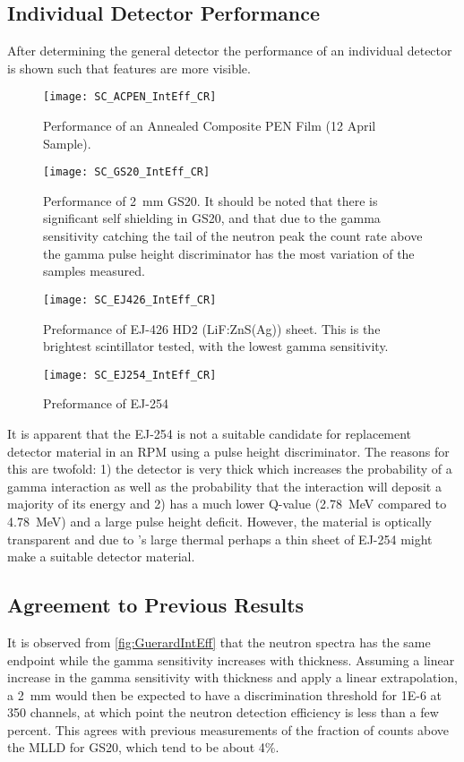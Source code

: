 \documentclass[draftcls,onecolumn]{IEEEtran}
\begin{document}
\subsection{Individual Detector Performance}
After determining the general detector the performance of an individual detector is shown such that features are more visible.
\begin{figure}
  \centering
  \texttt{[image: SC\_ACPEN\_IntEff\_CR]}
  \caption[Annealed Composite PEN Performance]{Performance of an Annealed Composite PEN Film (12 April Sample).}
  \label{fig:ACPENPreformance}
\end{figure}
\begin{figure}
  \centering
  \texttt{[image: SC\_GS20\_IntEff\_CR]}
  \caption[GS20 Performance]{Performance of \SI{2}{\mm} GS20.  It should be noted that there is significant self shielding in GS20, and that due to the gamma sensitivity catching the tail of the neutron peak the count rate above the gamma pulse height discriminator has the most variation of the samples measured.}
  \label{fig:GS20Preformance}
\end{figure}
\begin{figure}
  \centering
  \texttt{[image: SC\_EJ426\_IntEff\_CR]}
  \caption[EJ 426 Preformance]{Preformance of EJ-426 HD2 (LiF:ZnS(Ag)) sheet.  This is the brightest scintillator tested, with the lowest gamma sensitivity.}
  \label{fig:EJ254Perf}
\end{figure}
\begin{figure}
  \centering
  \texttt{[image: SC\_EJ254\_IntEff\_CR]}
  \caption[EJ 254 Preformance]{Preformance of EJ-254}
  \label{fig:EJ254Preformance}
\end{figure}
It is apparent that the EJ-254 is not a suitable candidate for replacement detector material in an RPM using a pulse height discriminator.
The reasons for this are twofold: 1) the detector is very thick which increases the probability of a gamma interaction as well as the probability that the interaction will deposit a majority of its energy and 2)  has a much lower Q-value (\SI{2.78}{\MeV} compared to \SI{4.78}{\MeV}) and a large pulse height deficit.
However, the material is optically transparent and due to 's large thermal perhaps a thin sheet of EJ-254 might make a suitable detector material.
\subsection{Agreement to Previous Results}
It is observed from \autoref{fig:GuerardIntEff} that the neutron spectra has the same endpoint while the gamma sensitivity increases with thickness.
Assuming a linear increase in the gamma sensitivity with thickness and apply a linear extrapolation, a \SI{2}{\mm} would then be expected to have a discrimination threshold for \num{1E-6} at 350 channels, at which point the neutron detection efficiency is less than a few percent.
This agrees with previous measurements of the fraction of counts above the MLLD for GS20, which tend to be about 4\%.
\end{document}
